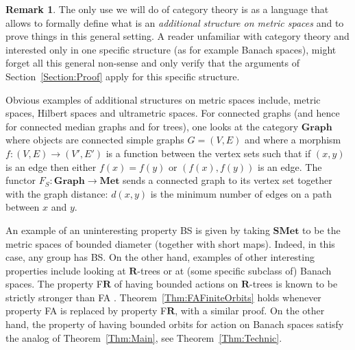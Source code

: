 \documentclass[a4paper]{article}
\newcommand{\PH}[1]{\todo[color={blue!33},size=small]{#1}}
\theoremstyle{definition}
\newtheorem{rem}[lem]{Remark}
\begin{document}
%
%
\begin{rem}
The only use we will do of category theory is as a language that allows to formally define what is an \emph{additional structure on metric spaces} and to prove things in this general setting.
A reader unfamiliar with category theory and interested only in one specific structure (as for example Banach spaces), might forget all this general non-sense and only verify that the arguments of Section~\ref{Section:Proof} apply for this specific structure.
\end{rem}
%
%
Obvious examples of additional structures on metric spaces include, metric spaces, Hilbert spaces and ultrametric spaces.
For connected graphs (and hence for connected median graphs and for trees), one looks at the category $\mathbf{Graph}$ where objects are connected simple graphs $G=(V,E)$ and where a morphism $f\colon (V,E)\to(V',E')$ is a function between the vertex sets such that if $(x,y)$ is an edge then either $f(x)=f(y)$ or $(f(x),f(y))$ is an edge.
The functor $F_S\colon\mathbf{Graph}\to\mathbf{Met}$ sends a connected graph to its vertex set together with the graph distance: $d(x,y)$ is the minimum number of edges on a path between $x$ and $y$.


%
%
%
An example of an uninteresting property BS is given by taking $\mathbf{SMet}$ to be the metric spaces of bounded diameter (together with short maps). Indeed, in this case, any group has BS.
On the other hand, examples\PH{J'ai rajouté ce qui suit} of other interesting properties include looking at $\mathbf{R}$-trees or at (some specific subclass of) Banach spaces.
The property F$\mathbf{R}$ of having bounded actions on $\mathbf{R}$-trees is known to be strictly stronger than FA \cite{MR3465847}. Theorem~\ref{Thm:FAFiniteOrbits} holds whenever property FA is replaced by property F$\mathbf{R}$, with a similar proof.
On the other hand, the property of having bounded orbits for action on Banach spaces satisfy the analog of Theorem~\ref{Thm:Main}, see Theorem~\ref{Thm:Technic}.
\end{document}

